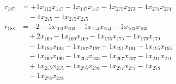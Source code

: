 \[\begin{aligned}
r_{187} &= + 1 x_{112} x_{147} - 1 x_{147} x_{147} - 1 x_{273} x_{273} - 1 x_{274} x_{274} \\
 &\quad - 1 x_{275} - 1 x_{275} x_{275}
\end{aligned}\]
\[\begin{aligned}
r_{188} &= - 2 - 1 x_{103} x_{103} - 1 x_{154} x_{154} - 1 x_{163} x_{163} \\
 &\quad + 2 x_{169} - 1 x_{169} x_{169} - 1 x_{175} x_{175} - 1 x_{179} x_{179} \\
 &\quad - 1 x_{183} x_{183} - 1 x_{187} x_{187} - 1 x_{191} x_{191} - 1 x_{195} x_{195} \\
 &\quad - 1 x_{199} x_{199} - 1 x_{203} x_{203} - 1 x_{207} x_{207} - 1 x_{211} x_{211} \\
 &\quad + 1 x_{215} x_{215} - 1 x_{276} x_{276} - 1 x_{277} x_{277} - 1 x_{278} \\
 &\quad - 1 x_{278} x_{278}
\end{aligned}\]
\endgroup
